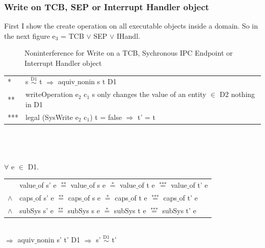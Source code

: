 \documentclass[pdftex,11pt,a4paper,twoside]{article}
\begin{document}
\subsubsection{Write on TCB, SEP or Interrupt Handler object}
First I show the create operation on all executable objects inside a domain. So in the next figure e$_3$ = TCB $\vee$ SEP $\vee$ IHandl.
\begin{flushleft}
\begin{figure}[H]
\caption{Noninterference for Write on a TCB, Sychronous IPC Endpoint or Interrupt Handler object}
\end{figure}
\end{flushleft}
\begin{tabular}{ll}
* & s $\overset{\text{D1}}{\sim}$ t $\Rightarrow$ aquiv$\_$nonin s t D1	\\ 
** & writeOperation e$_2$ c$_1$ s only changes the value of an entity $\in$ D2 nothing in D1 \\ 
*** & legal (SysWrite e$_2$ c$_1$) t = false $\Rightarrow$ t' = t
\end{tabular} \\ \\ \\
$\forall$ e $\in$ D1. \\ 
\begin{tabular}{ll}
& value$\_$of s' e $\overset{\text{**}}{=}$ value$\_$of s e $\overset{\text{*}}{=}$ value$\_$of t e $\overset{\text{***}}{=}$ value$\_$of t' e \\
$\wedge$ & caps$\_$of s' e $\overset{\text{**}}{=}$ caps$\_$of s e $\overset{\text{*}}{=}$ caps$\_$of t e $\overset{\text{***}}{=}$ caps$\_$of t' e \\
$\wedge$ & subSys s' e $\overset{\text{**}}{=}$ subSys s e $\overset{\text{*}}{=}$ subSys t e $\overset{\text{***}}{=}$ subSys t' e
\end{tabular} \\
$\Rightarrow$ aquiv$\_$nonin s' t' D1 $\Rightarrow$ s' $\overset{\text{D1}}{\sim}$ t' 
\end{document}
